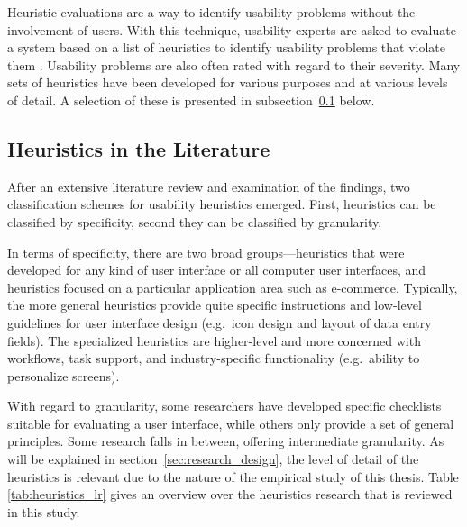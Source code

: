 Heuristic evaluations are a way to identify usability problems without the involvement of users. With this technique, usability experts are asked to evaluate a system based on a list of heuristics to identify usability problems that violate them \citep{Nielsen1993}. Usability problems are also often rated with regard to their severity. Many sets of heuristics have been developed for various purposes and at various levels of detail. A selection of these is presented in subsection~\ref{sec:heuristics_in_literature} below.

\subsection{Heuristics in the Literature}
\label{sec:heuristics_in_literature}
After an extensive literature review and examination of the findings, two classification schemes for usability heuristics emerged. First, heuristics can be classified by specificity, second they can be classified by granularity.

In terms of specificity, there are two broad groups---heuristics that were developed for any kind of user interface or all computer user interfaces, and heuristics focused on a particular application area such as e-commerce. Typically, the more general heuristics provide quite specific instructions and low-level guidelines for user interface design (e.g.\ icon design and layout of data entry fields). The specialized heuristics are higher-level and more concerned with workflows, task support, and industry-specific functionality (e.g.\ ability to personalize screens).

With regard to granularity, some researchers have developed specific checklists suitable for evaluating a user interface, while others only provide a set of general principles. Some research falls in between, offering intermediate granularity. As will be explained in section~\ref{sec:research_design}, the level of detail of the heuristics is relevant due to the nature of the empirical study of this thesis. Table \ref{tab:heuristics_lr} gives an overview over the heuristics research that is reviewed in this study.

